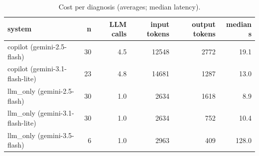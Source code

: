 \begin{table}[t]
\centering\small
\caption{Cost per diagnosis (averages; median latency).}\label{tab:rq2_cost}
\begin{tabular}{lrrrrr}
\toprule
system & n & LLM calls & input tokens & output tokens & median s \\
\midrule
copilot (gemini-2.5-flash) & 30 & 4.5 & 12548 & 2772 & 19.1 \\
copilot (gemini-3.1-flash-lite) & 23 & 4.8 & 14681 & 1287 & 13.0 \\
llm\_only (gemini-2.5-flash) & 30 & 1.0 & 2634 & 1618 & 8.9 \\
llm\_only (gemini-3.1-flash-lite) & 30 & 1.0 & 2634 & 752 & 10.4 \\
llm\_only (gemini-3.5-flash) & 6 & 1.0 & 2963 & 409 & 128.0 \\
\bottomrule
\end{tabular}
\end{table}
